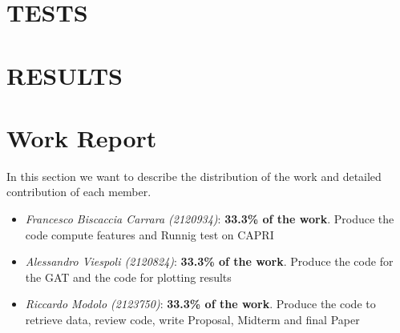 \documentclass[12pt,conference]{ieeeconf} %
\begin{document}
\section{TESTS} 

\section{RESULTS} 

\vspace{\fill}
\printbibliography
\newpage
\section*{Work Report}
In this section we want to describe the distribution of the work and detailed contribution of each member.
\begin{itemize}
    \item \textit{Francesco Biscaccia Carrara (2120934)}: {\textbf{33.3\% of the work}. Produce the code compute features and Runnig test on CAPRI}\\
    \item \textit{Alessandro Viespoli (2120824)}: {\textbf{33.3\% of the work}. Produce the code for the GAT and the code for plotting results}\\
    \item \textit{Riccardo Modolo (2123750)}: {\textbf{33.3\% of the work}. Produce the code to retrieve data, review code, write Proposal, Midterm  and final Paper}
\end{itemize}
\end{document}
